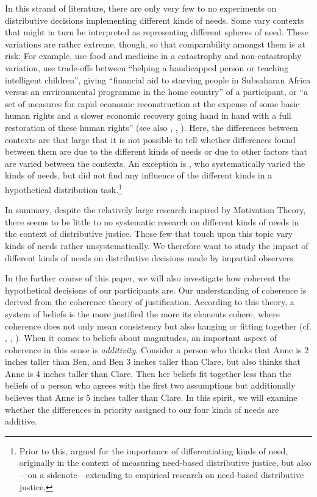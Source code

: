 \documentclass[egregdoesnotlikesansseriftitles]{scrartcl}
\begin{document}
In this strand of literature, there are only very few to no experiments on distributive decisions implementing different kinds of needs.
Some vary contexts that might in turn be interpreted as representing different spheres of need.
These variations are rather extreme, though, so that comparability amongst them is at risk: For example, \cite{scott_whats_2009} use food and medicine in a catastrophy and non-catastrophy variation, \citet[p. 630]{gaertner_equity_2007} use trade-offs between ``helping a handicapped person or teaching intelligent children'', giving ``financial aid to starving people in Subsaharan Africa versus an environmental programme in the home country'' of a participant, or ``a set of measures for rapid economic reconstruction at the expense of some basic human rights and a slower economic recovery going hand in hand with a full restoration of these human rights'' (see also \citealt{konow_fair_2001,konow_which_2003}, \citealt{gaertner_equity_2007}, \citealt{schwettmann_trading_2009}).
Here, the differences between contexts are that large that it is not possible to tell whether differences found between them are due to the different kinds of needs or due to other factors that are varied between the contexts.
An exception is \cite{bauer_needs_forthcoming}, who systematically varied the kinds of needs, but did not find any influence of the different kinds in a hypothetical distribution task.\footnote{Prior to this, \cite{bauer_sated_2018,bauer_sated_2022} argued for the importance of differentiating kinds of need, originally in the context of measuring need-based distributive justice, but also---on a sidenote---extending to empirical research on need-based distributive justice.}

In summary, despite the relatively large research inspired by Motivation Theory, there seems to be little to no systematic research on different kinds of needs in the context of distributive justice.
Those few that touch upon this topic vary kinds of needs rather unsystematically.
We therefore want to study the impact of different kinds of needs on distributive decisions made by impartial observers.

In the further course of this paper, we will also investigate how coherent the hypotheti\-cal decisions of our participants are.
Our understanding of coherence is derived from the coherence theory of justification.
According to this theory, a system of beliefs is the more justified the more its elements cohere, where coherence does not only mean consistency but also hanging or fitting together (cf. \citealt{bonjour_structure_1985}, \citealt{lehrer_theory_1990}, \citealt{thagard_coherence_2000}).
When it comes to beliefs about magnitudes, an important aspect of coherence in this sense is \textit{additivity}.
Consider a person who thinks that Anne is 2 inches taller than Ben, and Ben 3 inches taller than Clare, but also thinks that Anne is 4 inches taller than Clare.
Then her beliefs fit together less than the beliefs of a person who agrees with the first two assumptions but additionally believes that Anne is 5 inches taller than Clare.
In this spirit, we will examine whether the differences in priority assigned to our four kinds of needs are additive.
\end{document}
